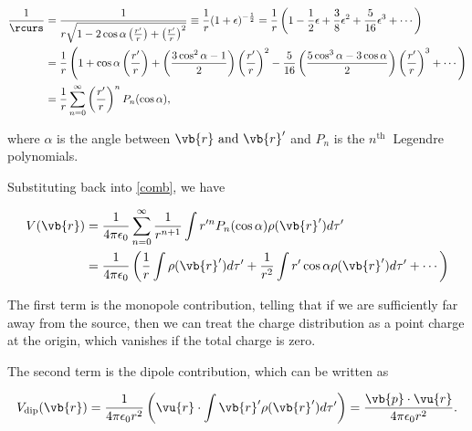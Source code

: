 \documentclass[english,a4paper,12pt]{report}
\begin{document}
\begin{equation} \label{1drj} 
    \begin{aligned} 
    \frac{1}{\rcurs } &= \frac{1}{ r \sqrt{1 - 2\cos \alpha \left( \frac{r'}{r}  \right) + \left( \frac{r'}{r}  \right)^2}} \equiv \frac{1}{r} (1 + \epsilon )^{-\frac{1}{2} } = \frac{1}{r} \left( 1 - \frac{1}{2}\epsilon  + \frac{3}{8} \epsilon ^2 + \frac{5}{16} \epsilon ^3 + \cdots  \right) \\
    &=\frac{1}{r} \left( 1 + \cos \alpha \left( \frac{r'}{r}  \right) + \left( \frac{3\cos ^2\alpha -1}{2} \right) \left( \frac{r'}{r}  \right)^2 -\frac{5}{16} \left( \frac{5\cos ^3 \alpha - 3\cos \alpha }{2} \right) \left( \frac{r'}{r} \right)^3 + \cdots \right) \\
    &= \frac{1}{r} \sum_{n=0}^{\infty} \left( \frac{r'}{r}  \right)^{n} P_{n}(\cos \alpha ),  
    \end{aligned} 
\end{equation}

where \(\alpha \) is the angle between \(\vb{r} \text { and } \vb{r} '\) and \(P_{n}\) is the \(n^{\text{th }} \) Legendre polynomials.    

Substituting back into \cref{comb}, we have 

\begin{equation}
    \begin{aligned} 
    V(\vb{r} ) &= \frac{1}{4\pi \epsilon _0} \sum_{n=0}^{\infty} \frac{1}{r^{n+1} } \int r'^{n} P_{n}(\cos \alpha )\rho (\vb{r} ')d\tau ' \\
    &= \frac{1}{4\pi \epsilon_0} \left( \frac{1}{r} \int \rho (\vb{r} ')d\tau ' + \frac{1}{r^2}\int r'\cos \alpha \rho (\vb{r} ')d\tau ' + \cdots  \right) 
    \end{aligned} 
\end{equation}

The first term is the monopole contribution, telling that if we are sufficiently far away from the source, then we can treat the charge distribution as a point charge at the origin, which vanishes if the total charge is zero.

The second term is the dipole contribution, which can be written as 

\begin{equation}
    V_{\text{dip} } (\vb{r} ) = \frac{1}{4\pi \epsilon_0r^2} \left( \vu{r}  \cdot \int \vb{r} ' \rho (\vb{r} ')d\tau '  \right) = \frac{\vb{p} \cdot \vu{r} }{4\pi \epsilon _0 r^2 }.    
\end{equation}
\end{document}
